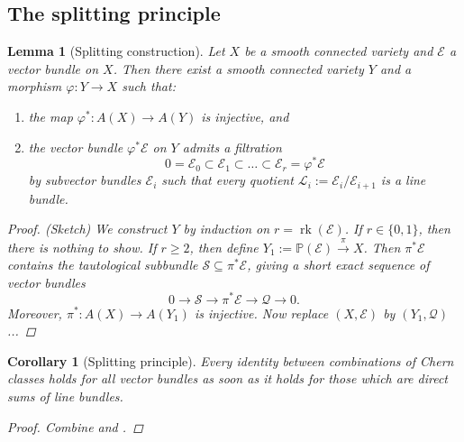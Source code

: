 \documentclass[12pt,a4paper]{amsart}
\theoremstyle{plain}
\newtheorem{lm}[thm]{Lemma}
\newtheorem{cor}[thm]{Corollary}
\theoremstyle{definition}
\theoremstyle{remark}
\begin{document}
\subsection{The splitting principle}

\begin{lm}[Splitting construction]\label{lm:splitting}
  Let $X$ be a smooth connected variety and $\mathscr{E}$ a vector bundle on $X$.
  Then there exist a smooth connected variety $Y$ and a morphism $\varphi \colon Y \to X$ such that:
  \begin{enumerate}[label=(\roman*)]
    \item the map $\varphi^{*} \colon A(X) \to A(Y)$ is injective, and
    \item the vector bundle $\varphi^{*}\mathscr{E}$ on $Y$ admits a filtration
      \[ 0 = \mathscr{E}_{0} \subset \mathscr{E}_{1} \subset \ldots \subset \mathscr{E}_{r} = \varphi^{*}\mathscr{E} \]
      by subvector bundles $\mathscr{E}_{i}$ such that every quotient $\mathscr{L}_{i} := \mathscr{E}_{i} / \mathscr{E}_{i+1}$ is a line bundle.
  \end{enumerate}
  \begin{proof}
    (Sketch) We construct $Y$ by induction on $r = \operatorname{rk}(\mathscr{E})$.
    If $r \in \{0,1\}$, then there is nothing to show.
    If $r \geq 2$, then define $Y_{1} := \mathbb{P}(\mathscr{E}) \xrightarrow{\pi} X$.
    Then $\pi^{*}\mathscr{E}$ contains the tautological subbundle $\mathscr{S} \subseteq \pi^{*}\mathscr{E}$, giving a short exact sequence of vector bundles
    \[ 0 \to \mathscr{S} \to \pi^{*}\mathscr{E} \to \mathscr{Q} \to 0. \]
    Moreover, $\pi^{*} \colon A(X) \to A(Y_{1})$ is injective.
    Now replace $(X,\mathscr{E})$ by $(Y_{1},\mathscr{Q})$...
  \end{proof}
\end{lm}

\begin{cor}[Splitting principle]
  Every identity between combinations of Chern classes holds for all vector bundles as soon as it holds for those which are direct sums of line bundles.
  \begin{proof}
    Combine  and .
  \end{proof}
\end{cor}
\end{document}
